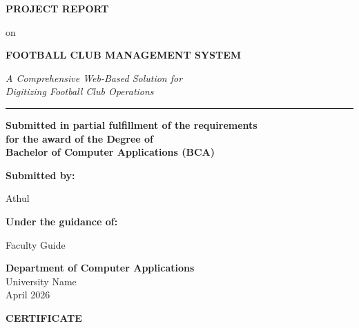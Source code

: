 \documentclass[12pt,a4paper,oneside]{report}
\newcommand{\projecttitle}{FOOTBALL CLUB MANAGEMENT SYSTEM}
\newcommand{\projectsubtitle}{A Comprehensive Web-Based Solution for\\
  Digitizing Football Club Operations}
\newcommand{\reportdate}{April 2026}
\begin{document}
\begin{titlepage}
  \centering
  \vspace*{1.5cm}

  {\Huge\bfseries PROJECT REPORT\par}
  \vspace{0.6cm}
  {\Large on\par}
  \vspace{0.6cm}
  {\Huge\bfseries\color{fcRed} \projecttitle\par}
  \vspace{0.4cm}
  {\large\itshape \projectsubtitle\par}

  \vspace{1.2cm}
  \rule{0.6\textwidth}{0.5pt}
  \vspace{0.8cm}

  {\large\textbf{Submitted in partial fulfillment of the requirements}\\
  \textbf{for the award of the Degree of}\\[6pt]
  \textbf{Bachelor of Computer Applications (BCA)}\par}

  \vspace{1cm}

  {\large\textbf{Submitted by:}\par}
  \vspace{0.3cm}
  {\Large Athul\par}

  \vspace{0.8cm}

  {\large\textbf{Under the guidance of:}\par}
  \vspace{0.3cm}
  {\Large Faculty Guide\par}

  \vfill

  {\large
    \textbf{Department of Computer Applications}\\[4pt]
    University Name\\[4pt]
    \reportdate
  \par}
\end{titlepage}

\newpage
\thispagestyle{empty}
\begin{center}
  {\Large\bfseries CERTIFICATE}\\[24pt]
\end{center}
\end{document}

